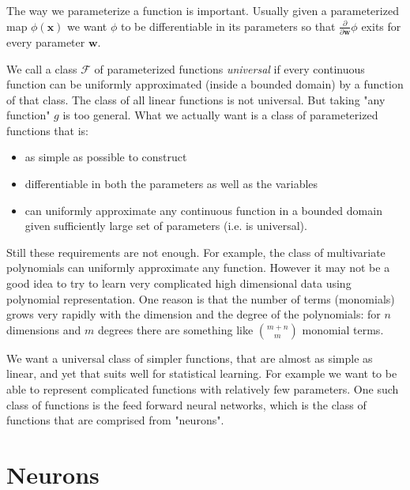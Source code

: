 \documentclass[11pt, a4paper]{report}
\theoremstyle{plain}
\theoremstyle{definition}
\theoremstyle{remark}
\newcommand{\R}{\mathbb{R}}
\newcommand{\x}{\mathbf{x}}
\newcommand{\w}{\mathbf{w}}
\begin{document}
The way we parameterize a function is important. Usually given a parameterized
map $\phi (\x)$ we want $\phi$ to be differentiable in its
parameters so that $\frac{\partial}{\partial \w} \phi$ exits for every parameter $\w$. 



We call a class $\mathcal{F}$ of parameterized functions \emph{universal} if
every continuous function can be uniformly approximated (inside a bounded
domain) by a function of that class. The class of all linear functions is not
universal. But taking "any function" $g$ is too general. What we actually want
is a class of parameterized functions that is:
\begin{itemize}
\item{} as simple as possible to construct
\item{} differentiable in both the parameters as well as the variables
\item{} can uniformly approximate any continuous function in a bounded domain
given sufficiently large set of
parameters (i.e. is universal).
\end{itemize}

Still these requirements are not enough.
For example, the class of multivariate polynomials can
uniformly approximate any function. However it may not be a good idea to try
to learn very complicated high dimensional data using polynomial representation. 
One reason is that the number of terms (monomials) grows very rapidly with the
dimension and the degree of the polynomials: for $n$ dimensions and $m$ degrees
there are something like $\binom{m + n}{m}$ monomial terms.

We want a universal class of simpler functions, that are almost as simple as linear,
and yet that suits well for statistical learning. For example we want to
be able to represent complicated functions with relatively few parameters.
One such class of functions is the feed forward neural networks,
which is the class of functions that are comprised from "neurons".

\section{Neurons}
\end{document}

